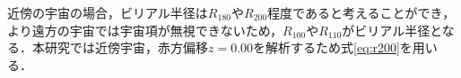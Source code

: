 近傍の宇宙の場合，ビリアル半径は$R_{180}$や$R_{200}$程度であると考えることができ，より遠方の宇宙では宇宙項が無視できないため，$R_{100}$や$R_{110}$がビリアル半径となる．本研究では近傍宇宙，赤方偏移$z=0.00$を解析するため式\eqref{eq:r200}を用いる．

%	
%	
%	
%	
%	
%	
